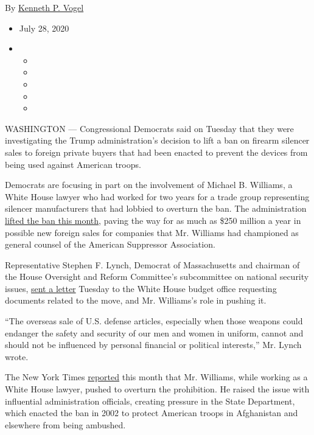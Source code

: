 By \href{https://www.nytimes.com/by/kenneth-p-vogel}{Kenneth P. Vogel}

\begin{itemize}
\item
  July 28, 2020
\item
  \begin{itemize}
  \item
  \item
  \item
  \item
  \item
  \end{itemize}
\end{itemize}

WASHINGTON --- Congressional Democrats said on Tuesday that they were
investigating the Trump administration's decision to lift a ban on
firearm silencer sales to foreign private buyers that had been enacted
to prevent the devices from being used against American troops.

Democrats are focusing in part on the involvement of Michael B.
Williams, a White House lawyer who had worked for two years for a trade
group representing silencer manufacturers that had lobbied to overturn
the ban. The administration
\href{https://www.nytimes.com/2020/07/13/us/trump-gun-silencer-exports.html}{lifted
the ban this month}, paving the way for as much as \$250 million a year
in possible new foreign sales for companies that Mr. Williams had
championed as general counsel of the American Suppressor Association.

Representative Stephen F. Lynch, Democrat of Massachusetts and chairman
of the House Oversight and Reform Committee's subcommittee on national
security issues,
\href{https://www.documentcloud.org/documents/7008622-House-Democrats-Investigate-the-Trump.html}{sent
a letter} Tuesday to the White House budget office requesting documents
related to the move, and Mr. Williams's role in pushing it.

``The overseas sale of U.S. defense articles, especially when those
weapons could endanger the safety and security of our men and women in
uniform, cannot and should not be influenced by personal financial or
political interests,'' Mr. Lynch wrote.

The New York Times
\href{https://www.nytimes.com/2020/07/13/us/trump-gun-silencer-exports.html}{reported}
this month that Mr. Williams, while working as a White House lawyer,
pushed to overturn the prohibition. He raised the issue with influential
administration officials, creating pressure in the State Department,
which enacted the ban in 2002 to protect American troops in Afghanistan
and elsewhere from being ambushed.

